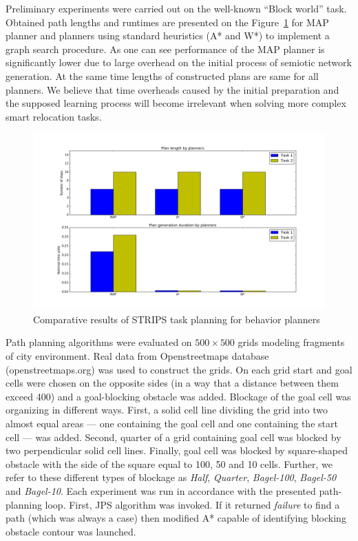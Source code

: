 \documentclass[procedia]{easychair}
\begin{document}
Preliminary experiments were carried out on the well-known ``Block world'' task. Obtained path lengths and runtimes are presented on the Figure~\ref{fig:beh_exper} for MAP planner and planners using standard heuristics (A* and W*) to implement a graph search procedure. As one can see performance of the MAP planner is significantly lower due to large overhead on the initial process of semiotic network generation. At the same time lengths of constructed plans are same for all planners. We believe that time overheads caused by the initial preparation and the supposed learning process will become irrelevant when solving more complex smart relocation tasks.

\begin{figure}[tb]
	\begin{centering}
		\includegraphics[width=\textwidth]{beh_exper}
		\caption{Comparative results of STRIPS task planning for behavior planners}
		\label{fig:beh_exper}
	\end{centering}
\end{figure}

Path planning algorithms were evaluated on $500\times500$ grids modeling fragments of city environment. Real data from Openstreetmaps database (openstreetmaps.org) was used to construct the grids. On each grid start and goal cells were chosen on the opposite sides (in a way that a distance between them exceed 400) and a goal-blocking obstacle was added. Blockage of the goal cell was organizing in different ways. First, a solid cell line dividing the grid into two almost equal areas --- one containing the goal cell and one containing the start cell --- was added. Second, quarter of a grid containing goal cell was blocked by two perpendicular solid cell lines. Finally, goal cell was blocked by square-shaped obstacle with the side of the square equal to 100, 50 and 10 cells. Further, we refer to these different types of blockage as \textit{Half}, \textit{Quarter}, \textit{Bagel-100}, \textit{Bagel-50} and \textit{Bagel-10}. Each experiment was run in accordance with the presented path-planning loop. First, JPS algorithm was invoked. If it returned \textit{failure} to find a path (which was always a case) then modified A* capable of identifying blocking obstacle contour was launched.
\end{document}
